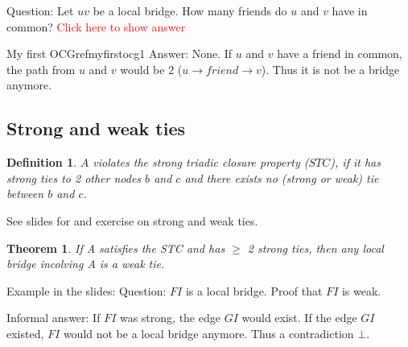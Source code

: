 \documentclass[12pt]{scrartcl}
\newtheorem{defi}{Definition}
\newtheorem{theo}{Theorem}
\begin{document}
\noindent Question: Let $uv$ be a local bridge. How many friends do $u$ and $v$ have in common?
%
{\textcolor{red}{Click here to show answer}}

\begin{ocg}{My first OCG}{refmyfirstocg}{1}
\noindent Answer: None. If $u$ and $v$ have a friend in common, the path from $u$ and $v$ would be 2 ($u \rightarrow friend  \rightarrow v$). Thus it is not be a bridge anymore. 
\end{ocg}

\subsection{Strong and weak ties}
\begin{defi}
	$A$ violates the strong triadic closure property ($STC$), if it has strong ties to 2 other nodes $b$ and $c$ and there exists no (strong or weak) tie between $b$ and $c$.
\end{defi}

\noindent See slides for and exercise on strong and weak ties.

\begin{theo}
	If A satisfies the STC and has $\geq$ 2 strong ties, then any local bridge incolving A is a weak tie.
\end{theo}

\noindent Example in the slides:
Question: $FI$ is a local bridge. Proof that $FI$ is weak. \newline

Informal answer: If $FI$ was strong, the edge $GI$ would exist. If the edge $GI$ existed, $FI$ would not be a local bridge anymore. Thus a contradiction $\bot$.
\end{document}
